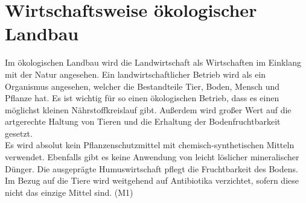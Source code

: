 \documentclass[12pt, a4paper]{report}
\begin{document}
	\bsremovechaptertitle
	\chapter{Wirtschaftsweise ökologischer Landbau}
	Im ökologischen Landbau wird die Landwirtschaft als Wirtschaften im Einklang mit der Natur angesehen.
	Ein landwirtschaftlicher Betrieb wird als ein Organismus angesehen, welcher die Bestandteile Tier, Boden, Mensch und Pflanze hat.
	Es ist wichtig für so einen ökologischen Betrieb, dass es einen möglichst kleinen Nährstoffkreislauf gibt.
	Außerdem wird großer Wert auf die artgerechte Haltung von Tieren und die Erhaltung der Bodenfruchtbarkeit gesetzt. \\
	Es wird absolut kein Pflanzenschutzmittel mit chemisch-synthetischen Mitteln verwendet.
	Ebenfalls gibt es keine Anwendung von leicht löslicher mineralischer Dünger.
	Die ausgeprägte Humuswirtschaft pflegt die Fruchtbarkeit des Bodens.
	Im Bezug auf die Tiere wird weitgehend auf Antibiotika verzichtet, sofern diese nicht das einzige Mittel sind.
	(M1) \\
\end{document}
